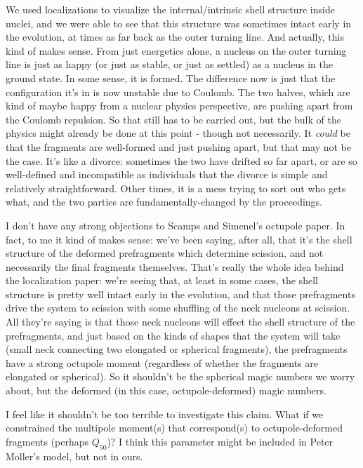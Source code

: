 We used localizations to visualize the internal/intrinsic shell structure inside nuclei, and we were able to see that this structure was sometimes intact early in the evolution, at times as far back as the outer turning line. And actually, this kind of makes sense. From just energetics alone, a nucleus on the outer turning line is just as happy (or just as stable, or just as settled) as a nucleus in the ground state. In some sense, it is formed. The difference now is just that the configuration it's in is now unstable due to Coulomb. The two halves, which are kind of maybe happy from a nuclear physics perspective, are pushing apart from the Coulomb repulsion. So that still has to be carried out, but the bulk of the physics might already be done at this point - though not necessarily. It \textit{could} be that the fragments are well-formed and just pushing apart, but that may not be the case. It's like a divorce: sometimes the two have drifted so far apart, or are so well-defined and incompatible as individuals that the divorce is simple and relatively straightforward. Other times, it is a mess trying to sort out who gets what, and the two parties are fundamentally-changed by the proceedings.

I don't have any strong objections to Scamps and Simenel's octupole paper. In fact, to me it kind of makes sense: we've been saying, after all, that it's the shell structure of the deformed prefragments which determine scission, and not necessarily the final fragments themselves. That's really the whole idea behind the localization paper: we're seeing that, at least in some cases, the shell structure is pretty well intact early in the evolution, and that those prefragments drive the system to scission with some shuffling of the neck nucleons at scission. All they're saying is that those neck nucleons will effect the shell structure of the prefragments, and just based on the kinds of shapes that the system will take (small neck connecting two elongated or spherical fragments), the prefragments have a strong octupole moment (regardless of whether the fragments are elongated or spherical). So it shouldn't be the spherical magic numbers we worry about, but the deformed (in this case, octupole-deformed) magic numbers.

I feel like it shouldn't be too terrible to investigate this claim. What if we constrained the multipole moment(s) that correspond(s) to octupole-deformed fragments (perhaps $Q_{50}$)? I think this parameter might be included in Peter Moller's model, but not in ours.

